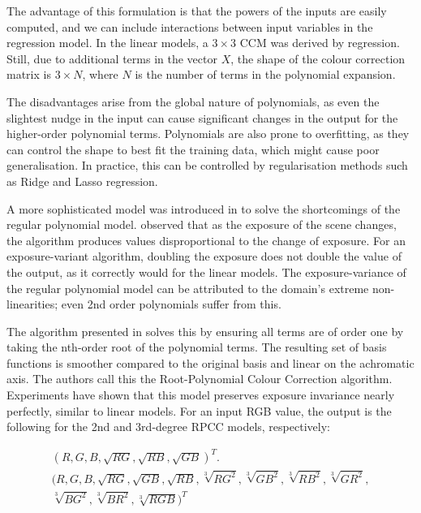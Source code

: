 The advantage of this formulation is that the powers of the inputs are easily computed, and we can include interactions between input variables in the regression model. In the linear models, a $3\times3$ CCM was derived by regression. Still, due to additional terms in the vector $X$, the shape of the colour correction matrix is $3\times N$, where $N$ is the number of terms in the polynomial expansion. 


The disadvantages arise from the global nature of polynomials, as even the slightest nudge in the input can cause significant changes in the output for the higher-order polynomial terms. Polynomials are also prone to overfitting, as they can control the shape to best fit the training data, which might cause poor generalisation. In practice, this can be controlled by regularisation methods such as Ridge \cite{hoerl2000ridge} and Lasso \cite{tibshirani1996regression} regression.

A more sophisticated model was introduced in \cite{finlayson2015color} to solve the shortcomings of the regular polynomial model. \citeauthor{finlayson2015color} observed that as the exposure of the scene changes, the algorithm produces values disproportional to the change of exposure. For an exposure-variant algorithm, doubling the exposure does not double the value of the output, as it correctly would for the linear models. The exposure-variance of the regular polynomial model can be attributed to the domain's extreme non-linearities; even 2nd order polynomials suffer from this.

The algorithm presented in \cite{finlayson2015color} solves this by ensuring all terms are of order one by taking the nth-order root of the polynomial terms. The resulting set of basis functions is smoother compared to the original basis and linear on the achromatic axis. The authors call this the Root-Polynomial Colour Correction algorithm. Experiments have shown that this model preserves exposure invariance nearly perfectly, similar to linear models. For an input RGB value, the output is the following for the 2nd and 3rd-degree RPCC models, respectively:

\begin{gather*}
    (R, G, B, \sqrt{RG}, \sqrt{RB}, \sqrt{GB})^T. \\
    (R, G, B, \sqrt{RG}, \sqrt{GB}, \sqrt{RB}, \sqrt[3]{RG^2}, \sqrt[3]{GB^2}, \sqrt[3]{RB^2}, \sqrt[3]{GR^2},\\
    \sqrt[3]{BG^2}, \sqrt[3]{BR^2}, \sqrt[3]{RGB})^T
\end{gather*}


